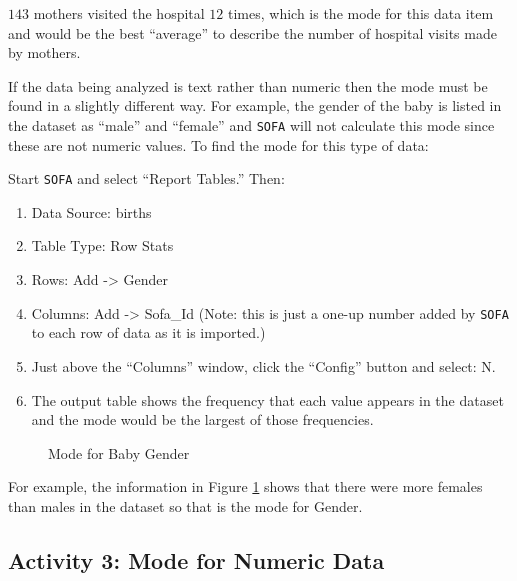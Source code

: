 $ 143 $ mothers visited the hospital $ 12 $ times, which is the mode for this data item and would be the best ``average'' to describe the number of hospital visits made by mothers.

If the data being analyzed is text rather than numeric then the mode must be found in a slightly different way. For example, the gender of the baby is listed in the dataset as ``male'' and ``female'' and \texttt{SOFA} will not calculate this mode since these are not numeric values. To find the mode for this type of data:

Start \texttt{SOFA} and select ``Report Tables.'' Then:

\begin{enumerate}
  \item Data Source: births
  \item Table Type: Row Stats
  \item Rows: Add -> Gender
  \item Columns: Add -> Sofa\_Id (Note: this is just a one-up number added by \texttt{SOFA} to each row of data as it is imported.)
  \item Just above the ``Columns'' window, click the ``Config'' button and select: N.
  \item The output table shows the frequency that each value appears in the dataset and the mode would be the largest of those frequencies.
\end{enumerate}

\begin{figure}[H]
  \begin{center}
    \caption{Mode for Baby Gender}
    \label{cen:img10}
  \end{center}
\end{figure}

For example, the information in Figure \ref{cen:img10} shows that there were more females than males in the dataset so that is the mode for Gender.

\subsection{Activity 3: Mode for Numeric Data} \label{cen:act03}

